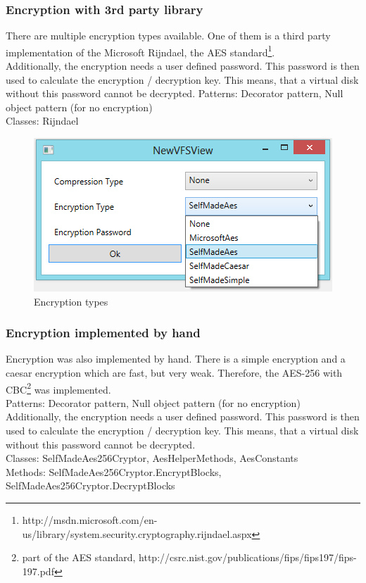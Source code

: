 \documentclass[JCDReport.tex]{subfiles}
\begin{document}
\subsubsection{Encryption with 3rd party library}
There are multiple encryption types available. One of them is a third party implementation of the Microsoft Rijndael, the AES standard\footnote{http://msdn.microsoft.com/en-us/library/system.security.cryptography.rijndael.aspx}.\\
Additionally, the encryption needs a user defined password. This password is then used to calculate the encryption / decryption key. This means, that a virtual disk without this password cannot be decrypted.
Patterns: Decorator pattern, Null object pattern (for no encryption)\\
Classes: Rijndael\\
\begin{figure}[h!]
	\centering
	\includegraphics[scale=1]{Images/encryption_types.png} 
	\caption{Encryption types}
\end{figure}

\subsubsection{Encryption implemented by hand}
Encryption was also implemented by hand. There is a simple encryption and a caesar encryption which are fast, but very weak. Therefore, the AES-256 with CBC\footnote{part of the AES standard, http://csrc.nist.gov/publications/fips/fips197/fips-197.pdf} was implemented.\\
Patterns: Decorator pattern, Null object pattern (for no encryption)\\
Additionally, the encryption needs a user defined password. This password is then used to calculate the encryption / decryption key. This means, that a virtual disk without this password cannot be decrypted.\\
Classes: SelfMadeAes256Cryptor, AesHelperMethods, AesConstants\\
Methods: SelfMadeAes256Cryptor.EncryptBlocks, SelfMadeAes256Cryptor.DecryptBlocks
\end{document}
